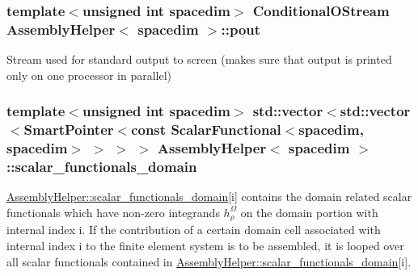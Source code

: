 \subsubsection[{\texorpdfstring{pout}{pout}}]{\setlength{\rightskip}{0pt plus 5cm}template$<$unsigned int spacedim$>$ {\bf Conditional\+O\+Stream} {\bf Assembly\+Helper}$<$ spacedim $>$\+::pout\hspace{0.3cm}{\ttfamily [private]}}\hypertarget{class_assembly_helper_a717eb6ebc7c62fe00063edcf264f3ecc}{}\label{class_assembly_helper_a717eb6ebc7c62fe00063edcf264f3ecc}
Stream used for standard output to screen (makes sure that output is printed only on one processor in parallel) 
\subsubsection[{\texorpdfstring{scalar\+\_\+functionals\+\_\+domain}{scalar_functionals_domain}}]{\setlength{\rightskip}{0pt plus 5cm}template$<$unsigned int spacedim$>$ std\+::vector$<$std\+::vector$<${\bf Smart\+Pointer}$<$const {\bf Scalar\+Functional}$<$spacedim, spacedim$>$ $>$ $>$ $>$ {\bf Assembly\+Helper}$<$ spacedim $>$\+::scalar\+\_\+functionals\+\_\+domain\hspace{0.3cm}{\ttfamily [private]}}\hypertarget{class_assembly_helper_aa6fa619e4c2582e95950e878cd06628e}{}\label{class_assembly_helper_aa6fa619e4c2582e95950e878cd06628e}
\hyperlink{class_assembly_helper_aa6fa619e4c2582e95950e878cd06628e}{Assembly\+Helper\+::scalar\+\_\+functionals\+\_\+domain}\mbox{[}{\ttfamily i}\mbox{]} contains the domain related scalar functionals which have non-\/zero integrands $h^\Omega_\rho$ on the domain portion with internal index {\ttfamily i}. If the contribution of a certain domain cell associated with internal index {\ttfamily i} to the finite element system is to be assembled, it is looped over all scalar functionals contained in \hyperlink{class_assembly_helper_aa6fa619e4c2582e95950e878cd06628e}{Assembly\+Helper\+::scalar\+\_\+functionals\+\_\+domain}\mbox{[}{\ttfamily i}\mbox{]}. 
